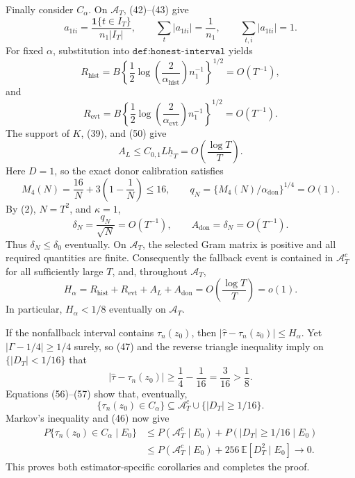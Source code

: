 Finally consider \(C_\alpha\).  On \(\mathcal A_T\), (42)--(43) give
\[
a_{1ti}=\frac{\mathbf1\{t\in I_T\}}{n_1|I_T|},
\qquad
\sum_t|a_{1ti}|=\frac1{n_1},
\qquad
\sum_{t,i}|a_{1ti}|=1.
\tag{50}
\]
For fixed \(\alpha\), substitution into \(\texttt{def:honest-interval}\) yields
\[
R_{\mathrm{hist}}
=B\left\{\frac12\log\left(\frac2{\alpha_{\mathrm{hist}}}\right)n_1^{-1}\right\}^{1/2}
=O(T^{-1}),
\tag{51}
\]
and
\[
R_{\mathrm{evt}}
=B\left\{\frac12\log\left(\frac2{\alpha_{\mathrm{evt}}}\right)n_1^{-1}\right\}^{1/2}
=O(T^{-1}).
\tag{52}
\]
The support of \(K\), (39), and (50) give
\[
A_L\le C_{0,1}L\underline h_T
=O\!\left(\frac{\log T}{T}\right).
\tag{53}
\]
Here \(D=1\), so the exact donor calibration satisfies
\[
M_4(N)=\frac{16}{N}+3\left(1-\frac1N\right)\le16,
\qquad
q_N=\{M_4(N)/\alpha_{\mathrm{don}}\}^{1/4}=O(1).
\tag{54}
\]
By (2), \(N=T^2\), and \(\kappa=1\),
\[
\delta_N=\frac{q_N}{\sqrt N}=O(T^{-1}),
\qquad
A_{\mathrm{don}}=\delta_N=O(T^{-1}).
\tag{55}
\]
Thus \(\delta_N\le\delta_0\) eventually.  On \(\mathcal A_T\), the selected Gram matrix is positive and all required quantities are finite.  Consequently the fallback event is contained in \(\mathcal A_T^c\) for all sufficiently large \(T\), and, throughout \(\mathcal A_T\),
\[
H_\alpha
=R_{\mathrm{hist}}+R_{\mathrm{evt}}+A_L+A_{\mathrm{don}}
=O\!\left(\frac{\log T}{T}\right)
=o(1).
\tag{56}
\]
In particular, \(H_\alpha<1/8\) eventually on \(\mathcal A_T\).

If the nonfallback interval contains \(\tau_n(z_0)\), then \(|\widehat\tau-\tau_n(z_0)|\le H_\alpha\).  Yet \(|\Gamma-1/4|\ge1/4\) surely, so (47) and the reverse triangle inequality imply on \(\{|D_T|<1/16\}\) that
\[
|\widehat\tau-\tau_n(z_0)|
\ge\frac14-\frac1{16}
=\frac3{16}>\frac18.
\tag{57}
\]
Equations (56)--(57) show that, eventually,
\[
\{\tau_n(z_0)\in C_\alpha\}
\subseteq \mathcal A_T^c\cup\{|D_T|\ge1/16\}.
\tag{58}
\]
Markov's inequality and (46) now give
\[
\begin{aligned}
P\{\tau_n(z_0)\in C_\alpha\mid E_0\}
&\le P(\mathcal A_T^c\mid E_0)
+P(|D_T|\ge1/16\mid E_0)\\
&\le P(\mathcal A_T^c\mid E_0)
+256\,\mathbb E[D_T^2\mid E_0]
\longrightarrow0.
\end{aligned}
\tag{59}
\]
This proves both estimator-specific corollaries and completes the proof.
